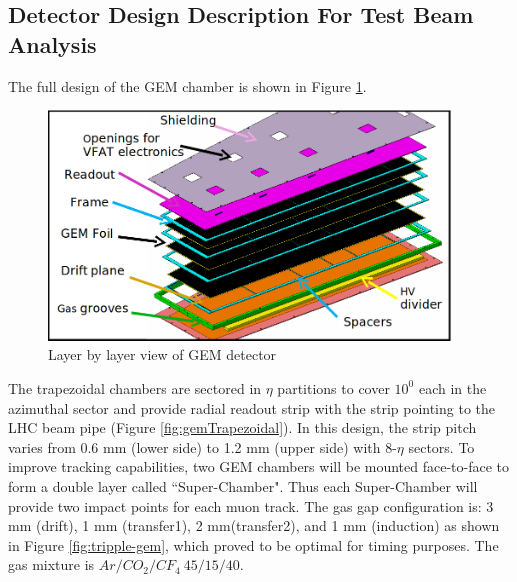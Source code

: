 \subsection{Detector Design Description For Test Beam Analysis}
The full design of the GEM chamber is shown in Figure \ref{fig:ge11}.
\begin{figure}[!htbp]
	\begin{center}
		\includegraphics[width=0.95\textwidth]{figures/GEM/ge11cad.png}
		\caption{Layer by layer view of GEM detector}
		\label{fig:ge11}
	\end{center}
\end{figure} 
The trapezoidal chambers are sectored in $\eta$ partitions to cover $10^0$ each in the azimuthal sector and provide radial readout strip with the strip pointing to the LHC beam pipe (Figure \ref{fig:gemTrapezoidal}). In this design, the strip pitch varies from 0.6 mm (lower side) to 1.2 mm (upper side) with 8-$\eta$ sectors. To improve tracking capabilities, two GEM chambers will be mounted face-to-face to form a double layer called ``Super-Chamber". Thus each Super-Chamber will provide two impact points for each muon track. The gas gap configuration is: 3 mm (drift), 1 mm (transfer1), 2 mm(transfer2), and 1 mm (induction) as shown in Figure \ref{fig:tripple-gem}, which proved to be optimal for timing purposes. The gas mixture is $Ar/CO_2/CF_4~45/15/40$.
